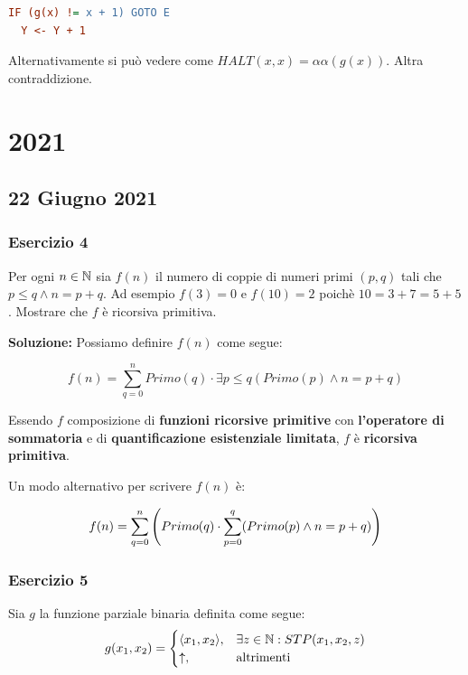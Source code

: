 \begin{lstlisting}[language=ini, caption={ }]
  IF (g(x) != x + 1) GOTO E
  Y <- Y + 1
\end{lstlisting}

Alternativamente si può vedere come \(HALT(x,x) = \alpha\alpha(g(x))\). Altra contraddizione.

\section{2021}

\subsection{22 Giugno 2021}

\subsubsection{Esercizio 4}

Per ogni \(n \in \mathbb{N}\) sia \(f(n)\) il numero di coppie di numeri primi \((p,q)\) tali che \(p\leq q \land n=p+q\). Ad esempio \(f(3)=0\) e \(f(10)=2\) poichè \(10=3+7=5+5\). Mostrare che \(f\) è ricorsiva primitiva.

\textbf{Soluzione: } Possiamo definire \(f(n)\) come segue:

\begin{equation}
  f(n) = \sum_{q=0}^{n} Primo(q) \cdot \exists p \leq q (Primo(p) \land n=p+q)
\end{equation}

Essendo \(f\) composizione di \textbf{funzioni ricorsive primitive} con \textbf{l'operatore di sommatoria} e di \textbf{quantificazione esistenziale limitata}, \(f\) è \textbf{ricorsiva primitiva}.

Un modo alternativo per scrivere \(f(n)\) è:

\begin{equation}
  f(n) = \sum_{q=0}^{n} \displaystyle{\left({Primo(q) \cdot \sum_{p=0}^q (Primo(p) \land n=p+q)}\right)}
\end{equation}

\subsubsection{Esercizio 5}

Sia \(g\) la funzione parziale binaria definita come segue:
\begin{equation}
  g(x_1, x_2) = \begin{cases}
    \displaystyle{\left\langle{x_1,x_2}\right\rangle}, & \exists z \in \mathbb{N}: STP(x_1,x_2,z)\\
    \uparrow, & \text{altrimenti}
  \end{cases}
\end{equation}

